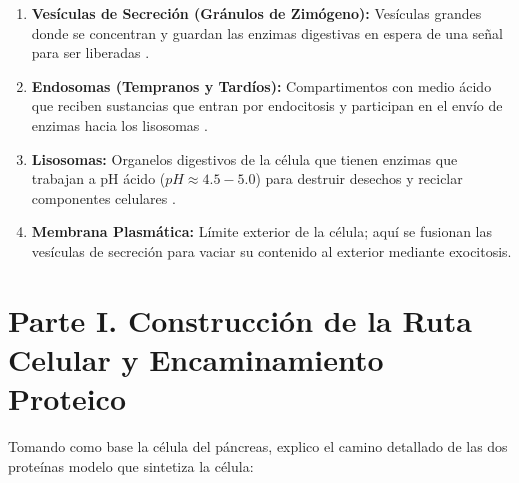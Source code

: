 \documentclass[12pt,spanish,letterpaper,oneside]{article}
\begin{document}
\begin{enumerate}
    \item \textbf{Vesículas de Secreción (Gránulos de Zimógeno):} Vesículas grandes donde se concentran y guardan las enzimas digestivas en espera de una señal para ser liberadas \parencite{kierszenbaum2020histologia}.
    \item \textbf{Endosomas (Tempranos y Tardíos):} Compartimentos con medio ácido que reciben sustancias que entran por endocitosis y participan en el envío de enzimas hacia los lisosomas \parencite{alberts2022molecular}.
    \item \textbf{Lisosomas:} Organelos digestivos de la célula que tienen enzimas que trabajan a pH ácido ($pH \approx 4.5-5.0$) para destruir desechos y reciclar componentes celulares \parencite{fortoul2020histologia, lieberman2018marks}.
    \item \textbf{Membrana Plasmática:} Límite exterior de la célula; aquí se fusionan las vesículas de secreción para vaciar su contenido al exterior mediante exocitosis.
\end{enumerate}

\section{Parte I. Construcción de la Ruta Celular y Encaminamiento Proteico}
Tomando como base la célula del páncreas, explico el camino detallado de las dos proteínas modelo que sintetiza la célula:
\end{document}
